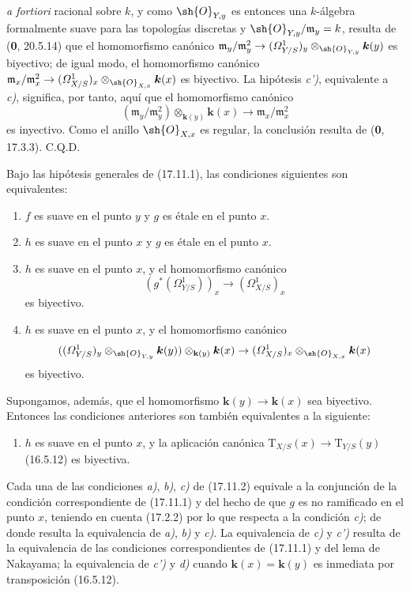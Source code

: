 
\emph{a fortiori} racional sobre $k$, y como $\sh{O}_{Y,y}$ es entonces una $k$-álgebra formalmente suave para las topologías discretas y $\sh{O}_{Y,y}/\mathfrak m_y=k$, resulta de (\textbf 0, 20.5.14) que el homomorfismo canónico $\mathfrak m_y/\mathfrak m_y^2\to(\varOmega^1_{Y/S})_y\otimes_{\sh{O}_{Y,y}}\boldsymbol{k}(y)$ es biyectivo; de igual modo, el homomorfismo canónico $\mathfrak m_x/\mathfrak m_x^2\to(\varOmega^1_{X/S})_x\otimes_{\sh{O}_{X,x}}\boldsymbol{k}(x)$ es biyectivo. La hipótesis \emph{c')}, equivalente a \emph{c)}, significa, por tanto, aquí que el homomorfismo canónico
\[
(\mathfrak m_y/\mathfrak m_y^2)\otimes_{\mathbf{k}(y)}\boldsymbol{k}(x)\to\mathfrak m_x/\mathfrak m_x^2
\]
es inyectivo. Como el anillo $\sh{O}_{X,x}$ es regular, la conclusión resulta de (\textbf 0, 17.3.3). C.Q.D.

\begin{corollary}[17.11.2]
\label{IV.17.11.2}
Bajo las hipótesis generales de \textup{(17.11.1)}, las condiciones siguientes son equivalentes:
\begin{enumerate}
  \item[\textup{a)}] $f$ es suave en el punto $y$ y $g$ es étale en el punto $x$.
  \item[\textup{b)}] $h$ es suave en el punto $x$ y $g$ es étale en el punto $x$.
  \item[\textup{c)}] $h$ es suave en el punto $x$, y el homomorfismo canónico
  \[
  (g^*(\varOmega^1_{Y/S}))_x\to(\varOmega^1_{X/S})_x
  \]
  es biyectivo.
  \item[\textup{c$'$)}] $h$ es suave en el punto $x$, y el homomorfismo canónico
  \[
  ((\varOmega^1_{Y/S})_y\otimes_{\sh{O}_{Y,y}}\boldsymbol{k}(y))\otimes_{\mathbf{k}(y)}\boldsymbol{k}(x)\to(\varOmega^1_{X/S})_x\otimes_{\sh{O}_{X,x}}\boldsymbol{k}(x)
  \]
  es biyectivo.
\end{enumerate}
Supongamos, además, que el homomorfismo $\boldsymbol{k}(y)\to\boldsymbol{k}(x)$ sea biyectivo. Entonces las condiciones anteriores son también equivalentes a la siguiente:
\begin{enumerate}
  \item[\textup{d)}] $h$ es suave en el punto $x$, y la aplicación canónica $\mathrm{T}_{X/S}(x)\to\mathrm{T}_{Y/S}(y)$ \textup{(16.5.12)} es biyectiva.
\end{enumerate}
\end{corollary}

Cada una de las condiciones \emph{a)}, \emph{b)}, \emph{c)} de (17.11.2) equivale a la conjunción de la condición correspondiente de (17.11.1) y del hecho de que $g$ es no ramificado en el punto $x$, teniendo en cuenta (17.2.2) por lo que respecta a la condición \emph{c)}; de donde resulta la equivalencia de \emph{a)}, \emph{b)} y \emph{c)}. La equivalencia de \emph{c)} y \emph{c')} resulta de la equivalencia de las condiciones correspondientes de (17.11.1) y del lema de Nakayama; la equivalencia de \emph{c')} y \emph{d)} cuando $\boldsymbol{k}(x)=\boldsymbol{k}(y)$ es inmediata por transposición (16.5.12).

